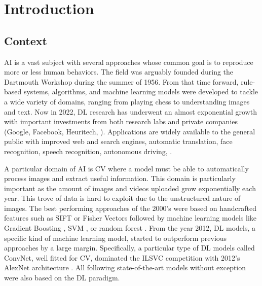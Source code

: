 \chapter{Introduction}
\label{chapter:introduction}

{}


\section{Context}

\acf{AI} is a vast subject with several approaches whose common goal is to reproduce more or less
human behaviors. The field was arguably founded during the Dartmouth Workshop during the summer of
1956. From that time forward, rule-based systems, algorithms, and machine learning models were
developed to tackle a wide variety of domains, ranging from playing chess to understanding images
and text. Now in 2022, \ac{DL} research has underwent an almost exponential growth with important investments
from both research labs and private companies (\eg Google, Facebook, Heuritech, \etc). Applications
are widely available to the general public with improved web and search engines, automatic
translation, face recognition, speech recognition, autonomous driving, \etc.

A particular domain of \ac{AI} is \ac{CV} where a model must be able to automatically process images
and extract useful information. This domain is particularly important as the amount of images and
videos uploaded grow exponentially each year. This trove of data is hard to exploit due to the
unstructured nature of images. The best performing approaches of the 2000's were based on
handcrafted features such as SIFT \citep{lowe1999sift} or Fisher Vectors \citep{csurka2010fishervectors} followed by
machine learning models like Gradient Boosting \citep{friedman2001gradientboosting}, \acs{SVM} \citep{cortes1995svm}, or
random forest \citep{ho1995randomforest}. From the year 2012, \acf{DL} models, a specific kind of machine learning
model, started to outperform previous approaches by a large margin. Specifically, a particular type
of \ac{DL} models called \acs{ConvNet}, well fitted for \ac{CV}, dominated the ILSVC competition
\citep{russakovsky2015imagenet_ilsvrc} with 2012's AlexNet architecture
\citep{krizhevsky2012alexnet}. All following state-of-the-art models without exception were also based on the
\ac{DL} paradigm.

